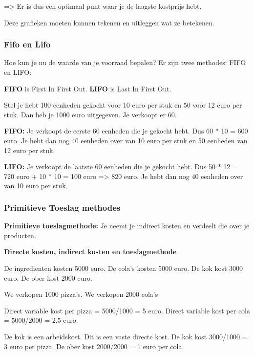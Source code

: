 \documentclass[a4paper,11pt]{article}
\begin{document}
=> Er is dus een optimaal punt waar je de laagste kostprijs hebt.

\begin{examenbox}
    Deze grafieken moeten kunnen tekenen 
    en uitleggen wat ze betekenen.
\end{examenbox}


\subsubsection{Fifo en Lifo}

\begin{conceptbox}


Hoe kun je nu de waarde van je voorraad bepalen?
Er zijn twee methodes: FIFO en LIFO:

\textbf{FIFO} is First In First Out.
\textbf{LIFO} is Last In First Out.
\end{conceptbox}


Stel je hebt 100 eenheden gekocht voor 10 euro per stuk
en 50 voor 12 euro per stuk.
Dan heb je 1000 euro uitgegeven.
Je verkoopt er 60.
\newline

\textbf{FIFO:}
Je verkoopt de eerste 60 eenheden die je gekocht hebt.
Dus 60 * 10 = 600 euro.
Je hebt dan nog 40 eenheden over van 10 euro per stuk en 50 eenheden van 12 euro per stuk.
\newline

\textbf{LIFO:}
Je verkoopt de laatste 60 eenheden die je gekocht hebt.
Dus 50 * 12 = 720 euro + 10 * 10 = 100 euro => 820 euro.
Je hebt dan nog 40 eenheden over van 10 euro per stuk.


\subsubsection{Primitieve Toeslag methodes}
\textbf{Primitieve toeslagmethode:} 
Je neemt je indirect kosten en verdeelt die over je producten.

\textbf{Directe kosten, indirect kosten en toeslagmethode}

De ingredienten kosten 5000 euro.
De cola's kosten 5000 euro.
De kok kost 3000 euro.
De ober kost 2000 euro.

We verkopen 1000 pizza's.
We verkopen 2000 cola's

Direct variable kost per pizza = 5000/1000 = 5 euro.
Direct variable kost per cola = 5000/2000 = 2.5 euro.

De kok is een arbeidskost. Dit is een vaste directe kost.
De kok kost 3000/1000 = 3 euro per pizza.
De ober kost 2000/2000 = 1 euro per cola. 
\end{document}
